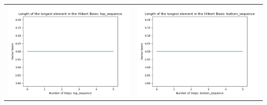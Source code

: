 \documentclass[10pt]{article}
\begin{document}
\begin{tabular}{c|c}
\begin{minipage}{.4\textwidth}
\includegraphics[width=\textwidth]{"DATA/5d/5 generators 2 bound G/top_sequence LENGTH"}
\end{minipage} &
\begin{minipage}{.4\textwidth}
\includegraphics[width=\textwidth]{"DATA/5d/5 generators 2 bound G bottomup/bottom_sequence LENGTH"}
\end{minipage}
\end{tabular}
\end{document}
